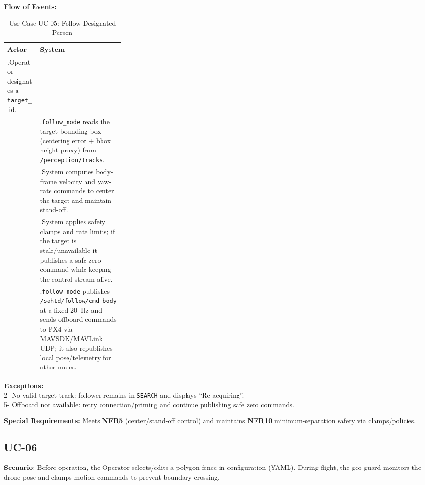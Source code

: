 \documentclass[12pt,a4paper]{report}
\begin{document}
\noindent\textbf{Flow of Events:}
\begin{table}[H]
\centering
\caption{Use Case UC-05: Follow Designated Person}
\label{tab:uc05_follow}
\begin{tabularx}{\linewidth}{|>{\raggedright\arraybackslash}p{0.28\linewidth}|>{\raggedright\arraybackslash}X|}
\hline
\textbf{Actor} & \textbf{System} \\
\hline
1.\;Operator designates a \texttt{target\_id}. & \\ \hline
 & 2.\;\texttt{follow\_node} reads the target bounding box (centering error + bbox height proxy) from \texttt{/perception/tracks}. \\ \hline
 & 3.\;System computes body-frame velocity and yaw-rate commands to center the target and maintain stand-off. \\ \hline
 & 4.\;System applies safety clamps and rate limits; if the target is stale/unavailable it publishes a safe zero command while keeping the control stream alive. \\ \hline
 & 5.\;\texttt{follow\_node} publishes \texttt{/sahtd/follow/cmd\_body} at a fixed 20~Hz and sends offboard commands to PX4 via MAVSDK/MAVLink UDP; it also republishes local pose/telemetry for other nodes. \\ \hline
\end{tabularx}
\end{table}

\vspace{0.5em}
\noindent\textbf{Exceptions:}\\
2- No valid target track: follower remains in \texttt{SEARCH} and displays ``Re-acquiring''.\\
5- Offboard not available: retry connection/priming and continue publishing safe zero commands.

\noindent\textbf{Special Requirements:} Meets \textbf{NFR5} (center/stand-off control) and maintains \textbf{NFR10} minimum-separation safety via clamps/policies.

\subsection*{UC-06}

\vspace{0.5em}
\noindent\textbf{Scenario:} Before operation, the Operator selects/edits a polygon fence in configuration (\ac{YAML}). During flight, the geo-guard monitors the drone pose and clamps motion commands to prevent boundary crossing.
\end{document}
